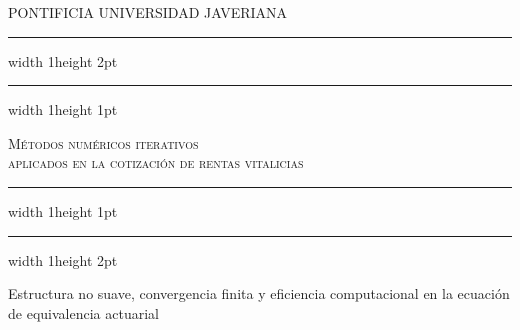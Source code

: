 \begin{titlepage}

\centering

\vspace*{1.2cm}


{\Large\scshape\color{azultesis}
PONTIFICIA UNIVERSIDAD JAVERIANA
}

\vspace{1.15cm}


\begin{center}
\hrule width 1\textwidth height 2pt
\vspace{1.5pt}
\hrule width 1\textwidth height 1pt
\end{center}

\vspace{0.2cm}


{\Large\scshape\color{azultesis}
Métodos numéricos iterativos\\
aplicados en la cotización de rentas vitalicias
}

\vspace{0.2cm}


\begin{center}
\hrule width 1\textwidth height 1pt
\vspace{1.5pt}
\hrule width 1\textwidth height 2pt
\end{center}

\vspace{0.1cm}


{\large
Estructura no suave, convergencia finita y eficiencia computacional en la ecuación de equivalencia actuarial
}

\vspace{3.5cm}



\end{titlepage}
